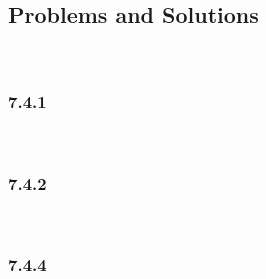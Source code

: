 \subsection{Problems and Solutions}\hfill\\\par
\subsubsection{7.4.1}\hfill\\
\par\bigskip
\subsubsection{7.4.2}\hfill\\
\par\bigskip
\subsubsection{7.4.4}\hfill\\

